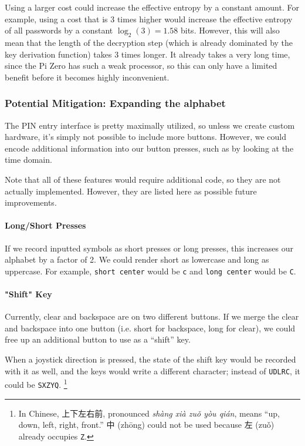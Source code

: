\documentclass{article}
\begin{document}
Using a larger cost could increase the effective entropy by a constant amount. For example, using a cost that is 3 times higher would increase the effective entropy of all passwords by a constant $\log_2(3) = 1.58$ bits. However, this will also mean that the length of the decryption step (which is already dominated by the key derivation function) takes 3 times longer. It already takes a very long time, since the Pi Zero has such a weak processor, so this can only have a limited benefit before it becomes highly inconvenient.

\subsubsection{Potential Mitigation: Expanding the alphabet}

The PIN entry interface is pretty maximally utilized, so unless we create custom hardware, it's simply not possible to include more buttons. However, we could encode additional information into our button presses, such as by looking at the time domain.

Note that all of these features would require additional code, so they are not actually implemented. However, they are listed here as possible future improvements.

\paragraph{Long/Short Presses} If we record inputted symbols as short presses or long presses, this increases our alphabet by a factor of 2. We could render short as lowercase and long as uppercase. For example, \texttt{short center} would be \texttt{c} and \texttt{long center} would be \texttt{C}.

\paragraph{"Shift" Key} Currently, clear and backspace are on two different buttons. If we merge the clear and backspace into one button (i.e. short for backspace, long for clear), we could free up an additional button to use as a ``shift'' key.

\begin{CJK*}{UTF8}{gbsn}
When a joystick direction is pressed, the state of the shift key would be recorded with it as well, and the keys would write a different character; instead of \texttt{UDLRC}, it could be \texttt{SXZYQ}. \footnote{In Chinese, 上下左右前, pronounced \textit{shàng xià zuǒ yòu qián}, means ``up, down, left, right, front.'' 中 (zhōng) could not be used because 左 (zuǒ) already occupies \texttt{Z}.}
\end{CJK*}
\end{document}
